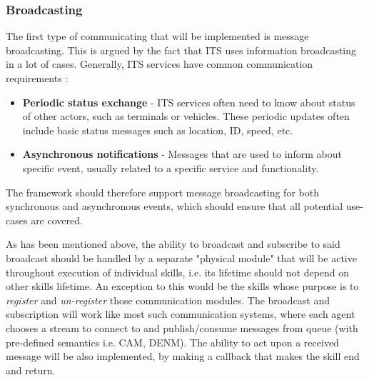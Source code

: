 \documentclass[main.tex]{subfiles}
\begin{document}
\subsubsection{Broadcasting}

The first type of communicating that will be implemented is message broadcasting. This is 
argued by the fact that ITS uses information broadcasting in a lot of cases.
Generally, ITS services have common communication requirements \cite{Santa2013}:

\begin{itemize}
    \item \textbf{Periodic status exchange} - ITS services often need to know about 
    status of other actors, such as terminals or vehicles. These periodic updates 
    often include basic status messages such as location, ID, speed, etc.
    \item \textbf{Asynchronous notifications} - Messages that are used to inform 
    about specific event, usually related to a specific service and functionality.
\end{itemize}



The framework should therefore support message broadcasting for both synchronous and 
asynchronous events, which should ensure that all potential use-cases are covered. 

As has been mentioned above, the ability to broadcast and subscribe to said broadcast should be
handled by a separate "physical module" that will be active throughout execution of individual
skills, i.e.  its lifetime should not depend on other skills lifetime. An exception to this
would be the skills whose purpose is to \emph{register} and \emph{un-register} those
communication modules.  The broadcast and subscription will work like most such communication
systems, where each agent chooses a stream to connect to and publish/consume messages from
queue (with pre-defined semantics i.e. CAM, DENM). The ability to act upon a received message
will be also implemented, by making a callback that makes the skill end and return. 
\end{document}
